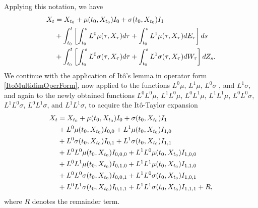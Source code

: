 Applying this notation, we have
\begin{align}
X_t&=X_{t_0} + \mu(t_0,X_{t_0})I_0+\sigma(t_0,X_{t_0})I_1 \notag \\
&+\int_{t_0}^t\left[
\int_{t_0}^{s}L^0\mu(\tau,X_\tau)d\tau
+\int_{t_0}^{s}L^1\mu(\tau,X_\tau)dE_\tau
\right]ds \notag \\
&+\int_{t_0}^t\left[
\int_{t_0}^{s}L^0\sigma(\tau,X_\tau)d\tau
+\int_{t_0}^{s}L^1\sigma(\tau,X_\tau)dW_\tau
\right]dZ_s.
\end{align}
We continue with the application of Itô's lemma in operator form \eqref{ItoMultidimOperForm}, now applied to the functions
$ L^0\mu$, 
$L^1\mu$, 
$L^0\sigma$ ,
and $L^1\sigma$, and again to the newly obtained functions 
$ 
L^0L^0\mu$, 
$L^1L^0\mu$, 
$L^0L^1\mu$, 
$L^1L^1\mu$, 
$L^0L^0\sigma$, 
$L^1L^0\sigma$, 
$L^0L^1\sigma$, and
$L^1L^1\sigma$,
to acquire the It\^o-Taylor expansion
\begin{align}
X_t&=X_{t_0}+\mu(t_0,X_{t_0})I_0+\sigma(t_0,X_{t_0})I_1\notag\\
&+L^0\mu(t_0,X_{t_0})I_{0,0}+L^1\mu(t_0,X_{t_0})I_{1,0}\notag\\
&+L^0\sigma(t_0,X_{t_0})I_{0,1}+L^1\sigma(t_0,X_{t_0})I_{1,1}\notag\\
&+L^0L^0\mu(t_0,X_{t_0})I_{0,0,0}+L^1L^0\mu(t_0,X_{t_0})I_{1,0,0}\notag\\
&+L^0L^1\mu(t_0,X_{t_0})I_{0,1,0}+L^1L^1\mu(t_0,X_{t_0})I_{1,1,0}\notag\\
&+L^0L^0\sigma(t_0,X_{t_0})I_{0,0,1}+L^1L^0\sigma(t_0,X_{t_0})I_{1,0,1}\notag\\
&+L^0L^1\sigma(t_0,X_{t_0})I_{0,1,1} + L^1L^1\sigma(t_0,X_{t_0})I_{1,1,1}+R,
\end{align}
where $R$ denotes the remainder term.

